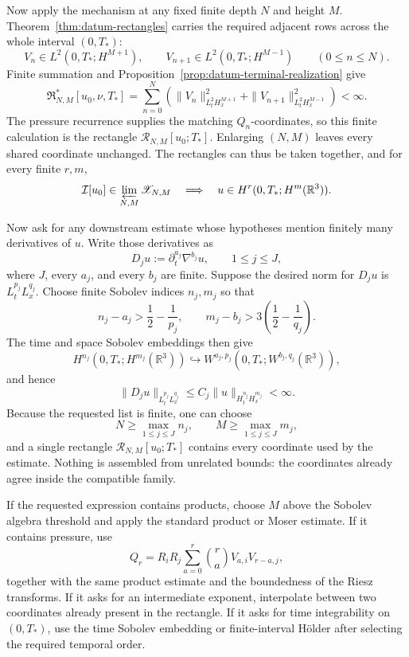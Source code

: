 Now apply the mechanism at any fixed finite depth \(N\) and height \(M\).
Theorem~\ref{thm:datum-rectangles} carries the required adjacent rows across
the whole interval \((0,T_*)\):
\[
V_n\in L^2(0,T_*;H^{M+1}),
\qquad
V_{n+1}\in L^2(0,T_*;H^{M-1})
\qquad(0\le n\le N).
\]
Finite summation and Proposition~\ref{prop:datum-terminal-realization} give
\[
\mathfrak R^*_{N,M}[u_0,\nu,T_*]
=\sum_{n=0}^{N}
\left(
\|V_n\|_{L^2_tH^{M+1}_x}^2
+\|V_{n+1}\|_{L^2_tH^{M-1}_x}^2
\right)<\infty.
\]
The pressure recurrence supplies the matching \(Q_n\)-coordinates, so this
finite calculation is the rectangle \(\mathcal R_{N,M}[u_0;T_*]\).  Enlarging
\((N,M)\) leaves every shared coordinate unchanged.  The rectangles can thus
be taken together, and for every finite \(r,m\),
\[
\mathcal I[u_0]
\in\varprojlim_{N,M}\mathscr X_{N,M}
\quad\Longrightarrow\quad
u\in H^r(0,T_*;H^m(\mathbb R^3)).
\]

\clearpage

Now ask for any downstream estimate whose hypotheses mention finitely many
derivatives of \(u\).  Write those derivatives as
\[
D_j u:=\partial_t^{a_j}\nabla^{b_j}u,
\qquad 1\le j\le J,
\]
where \(J\), every \(a_j\), and every \(b_j\) are finite.  Suppose the desired
norm for \(D_j u\) is \(L_t^{p_j}L_x^{q_j}\).  Choose finite Sobolev indices
\(n_j,m_j\) so that
\[
n_j-a_j>\frac12-\frac1{p_j},
\qquad
m_j-b_j>3\!\left(\frac12-\frac1{q_j}\right).
\]
The time and space Sobolev embeddings then give
\[
H^{n_j}(0,T_*;H^{m_j}(\mathbb R^3))
\hookrightarrow
W^{a_j,p_j}(0,T_*;W^{b_j,q_j}(\mathbb R^3)),
\]
and hence
\[
\|D_j u\|_{L_t^{p_j}L_x^{q_j}}
\le
C_j\|u\|_{H_t^{n_j}H_x^{m_j}}<\infty.
\]
Because the requested list is finite, one can choose
\[
N\ge\max_{1\le j\le J}n_j,
\qquad
M\ge\max_{1\le j\le J}m_j,
\]
and a single rectangle \(\mathcal R_{N,M}[u_0;T_*]\) contains every coordinate
used by the estimate.  Nothing is assembled from unrelated bounds: the
coordinates already agree inside the compatible family.

If the requested expression contains products, choose \(M\) above the
Sobolev algebra threshold and apply the standard product or Moser estimate.
If it contains pressure, use
\[
Q_r
=R_iR_j\sum_{a=0}^{r}\binom ra V_{a,i}V_{r-a,j},
\]
together with the same product estimate and the boundedness of the Riesz
transforms.  If it asks for an intermediate exponent, interpolate between two
coordinates already present in the rectangle.  If it asks for time
integrability on \((0,T_*)\), use the time Sobolev embedding or finite-interval
H\"older after selecting the required temporal order.

